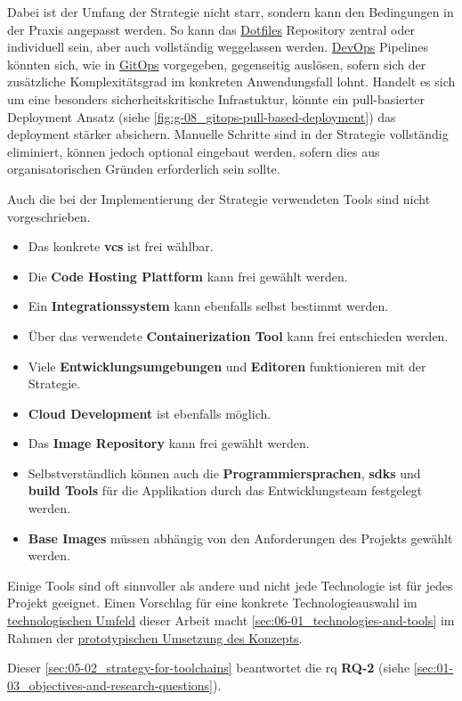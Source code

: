 Dabei ist der Umfang der Strategie nicht starr, sondern kann den Bedingungen in der Praxis angepasst werden. So kann das \hyperref[sec:03-04_dotfiles]{Dotfiles} Repository zentral oder individuell sein, aber auch vollständig weggelassen werden. \hyperref[sec:03-01_devops]{DevOps} Pipelines könnten sich, wie in \hyperref[sec:03-03_gitops]{GitOps} vorgegeben, gegenseitig auslösen, sofern sich der zusätzliche Komplexitätsgrad im konkreten Anwendungsfall lohnt. Handelt es sich um eine besonders sicherheitskritische Infrastuktur, könnte ein pull-basierter Deployment Ansatz (siehe \autoref{fig:g-08_gitops-pull-based-deployment}) das \Gls{deployment} stärker absichern. Manuelle Schritte sind in der Strategie vollständig eliminiert, können jedoch optional eingebaut werden, sofern dies aus organisatorischen Gründen erforderlich sein sollte.

Auch die bei der Implementierung der Strategie verwendeten Tools sind nicht vorgeschrieben.

\begin{itemize}
    \item Das konkrete \textbf{\Gls{vcs}} ist frei wählbar.
    \item Die \textbf{Code Hosting Plattform} kann frei gewählt werden.
    \item Ein \textbf{Integrationssystem} kann ebenfalls selbst bestimmt werden.
    \item Über das verwendete \textbf{Containerization Tool} kann frei entschieden werden.
    \item Viele \textbf{Entwicklungsumgebungen} und \textbf{Editoren} funktionieren mit der Strategie.
    \item \textbf{Cloud Development} ist ebenfalls möglich.
    \item Das \textbf{Image Repository} kann frei gewählt werden.
    \item Selbstverständlich können auch die \textbf{Programmiersprachen}, \textbf{\Glspl{sdk}} und \textbf{\Gls{build} Tools} für die Applikation durch das Entwicklungsteam festgelegt werden.
    \item \textbf{Base Images} müssen abhängig von den Anforderungen des Projekts gewählt werden.
\end{itemize}

Einige Tools sind oft sinnvoller als andere und nicht jede Technologie ist für jedes Projekt geeignet. Einen Vorschlag für eine konkrete Technologieauswahl im \hyperref[ch:02_technological-environment]{technologischen Umfeld} dieser Arbeit macht \autoref{sec:06-01_technologies-and-tools} im Rahmen der \hyperref[ch:06_prototypical-implementation-of-the-concept]{prototypischen Umsetzung des Konzepts}.

Dieser \autoref{sec:05-02_strategy-for-toolchains} beantwortet die \acrlong{rq} \textbf{RQ-2} (siehe \autoref{sec:01-03_objectives-and-research-questions}).
